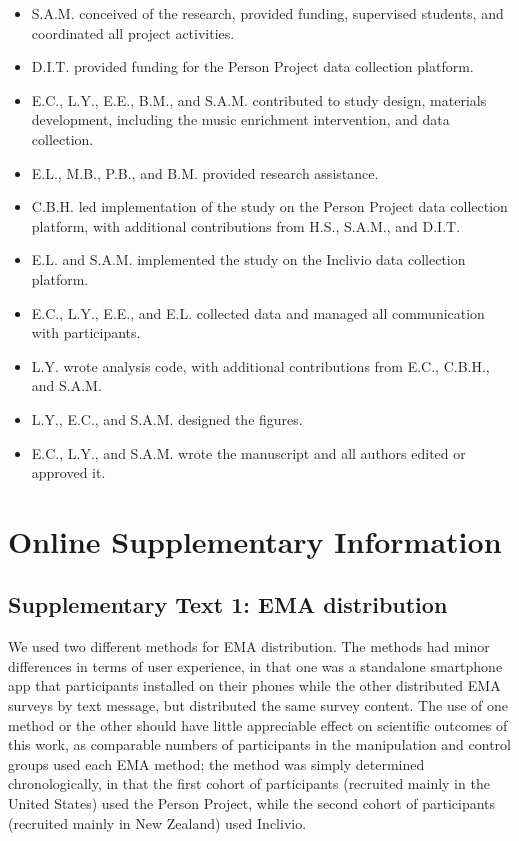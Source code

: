 \documentclass[
]{article}
\providecommand{\tightlist}{%
  \setlength{\itemsep}{0pt}\setlength{\parskip}{0pt}}
\begin{document}
\begin{itemize}
\tightlist
\item
  S.A.M. conceived of the research, provided funding, supervised
  students, and coordinated all project activities.
\item
  D.I.T. provided funding for the Person Project data collection
  platform.
\item
  E.C., L.Y., E.E., B.M., and S.A.M. contributed to study design,
  materials development, including the music enrichment intervention,
  and data collection.
\item
  E.L., M.B., P.B., and B.M. provided research assistance.
\item
  C.B.H. led implementation of the study on the Person Project data
  collection platform, with additional contributions from H.S., S.A.M.,
  and D.I.T.
\item
  E.L. and S.A.M. implemented the study on the Inclivio data collection
  platform.
\item
  E.C., L.Y., E.E., and E.L. collected data and managed all
  communication with participants.
\item
  L.Y. wrote analysis code, with additional contributions from E.C.,
  C.B.H., and S.A.M.
\item
  L.Y., E.C., and S.A.M. designed the figures.
\item
  E.C., L.Y., and S.A.M. wrote the manuscript and all authors edited or
  approved it.
\end{itemize}

\newpage

\section*{Online Supplementary
Information}\label{online-supplementary-information}

\subsection*{Supplementary Text 1: EMA
distribution}\label{supplementary-text-1-ema-distribution}

We used two different methods for EMA distribution. The methods had
minor differences in terms of user experience, in that one was a
standalone smartphone app that participants installed on their phones
while the other distributed EMA surveys by text message, but distributed
the same survey content. The use of one method or the other should have
little appreciable effect on scientific outcomes of this work, as
comparable numbers of participants in the manipulation and control
groups used each EMA method; the method was simply determined
chronologically, in that the first cohort of participants (recruited
mainly in the United States) used the Person Project, while the second
cohort of participants (recruited mainly in New Zealand) used Inclivio.
\end{document}
